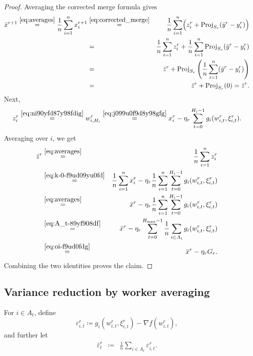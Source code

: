 \documentclass{article}
\newcommand{\eqdef}{\coloneqq}
\newcommand{\Proj}{{\rm Proj}} %
\theoremstyle{plain}
\theoremstyle{definition}
\begin{document}
\begin{proof}
Averaging the corrected merge formula gives
\begin{eqnarray*}
\bar x^{r+1}
\overset{\eqref{eq:averages}}{=}   \frac{1}{n}\sum_{i=1}^n x_i^{r+1}
&\overset{\eqref{eq:corrected_merge}}{=}& \frac{1}{n}\sum_{i=1}^n \Bigl(z_i^r+\Proj_{S_r}(\bar y^r-y_i^r)\Bigr) \\
&=& \frac{1}{n}\sum_{i=1}^n z_i^r + \frac{1}{n}\sum_{i=1}^n  \Proj_{S_r}(\bar y^r-y_i^r)\\
&=&
\bar z^r + \Proj_{S_r}\left(\frac{1}{n}\sum_{i=1}^n (\bar y^r- y_i^r)\right)\\
&=&
\bar z^r + \Proj_{S_r}(0) =\bar z^r.
\end{eqnarray*}
Next,
\begin{eqnarray}
z_i^r
 \overset{\eqref{eq:ni90yfd87y98fdig}}{=} w_{i,H_i}^r  \overset{\eqref{eq:j099u0f9d8y98gfg}}{=} 
x_i^r-\eta_r\sum_{t=0}^{H_i-1} g_i(w_{i,t}^r,\xi_{i,t}^r). \label{eq:k-0-f9ud09yu0fd}
\end{eqnarray}
Averaging over \(i\), we get
\begin{eqnarray*}
\bar z^r &\overset{\eqref{eq:averages}}{=} & \frac{1}{n}\sum_{i=1}^n z_i^r  \\
&\overset{\eqref{eq:k-0-f9ud09yu0fd}}{=}&
 \frac{1}{n}\sum_{i=1}^n x_i^r - \eta_r\frac{1}{n}\sum_{i=1}^n\sum_{t=0}^{H_i-1} g_i(w_{i,t}^r,\xi_{i,t}^r) \\
&\overset{\eqref{eq:averages}}{=} &
\bar x^r - \eta_r\frac{1}{n}\sum_{i=1}^n\sum_{t=0}^{H_i-1} g_i(w_{i,t}^r,\xi_{i,t}^r) \\
&\overset{\eqref{eq:A_t-89yf908df}}{=}&
\bar x^r - \eta_r\sum_{t=0}^{H_{\max}-1}\frac{1}{n}\sum_{i\in A_t} g_i(w_{i,t}^r,\xi_{i,t}^r) \\
&\overset{\eqref{eq:oi-f9ud0fdg}}{=}&
\bar x^r - \eta_r G_r.
\end{eqnarray*}
Combining the two identities proves the claim.
\end{proof}

\subsection{Variance reduction by worker averaging}


For \(i\in A_t\), define \begin{equation} \label{eq:-0-89u09980gf_0fgg}
\varepsilon_{i,t}^r
\eqdef
g_i(w_{i,t}^r,\xi_{i,t}^r)-\nabla f(w_{i,t}^r),
\end{equation}
and further let
\begin{eqnarray}
\bar\varepsilon_t^r
& \eqdef &  \frac{1}{n}\sum_{i\in A_t} \varepsilon_{i,t}^r. 
\label{eq:-8-f9d--08g} 
\end{eqnarray}
\end{document}
